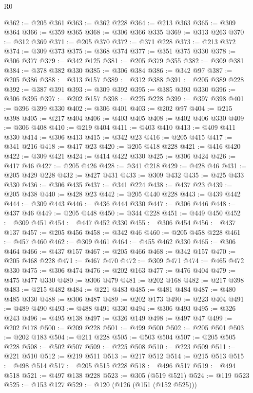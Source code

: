 \begin{lexlean}{R0}
\begin{coremodule}
@362 := @205 @361
@363 := @362 @228
@364 := @213 @363
@365 := @309 @364
@366 := @359 @365
@368 := @306 @366 @335
@369 := @313 @263
@370 := @312 @369
@371 := @205 @370
@372 := @371 @228
@373 := @213 @372
@374 := @309 @373
@375 := @368 @374
@377 := @351 @375 @330
@378 := @306 @377
@379 := @342 @125
@381 := @205 @379 @355
@382 := @309 @381
@384 := @378 @382 @330
@385 := @306 @384
@386 := @342 @97
@387 := @205 @386
@388 := @313 @157
@389 := @312 @388
@391 := @205 @389 @228
@392 := @387 @391
@393 := @309 @392
@395 := @385 @393 @330
@396 := @306 @395
@397 := @202 @157
@398 := @225 @228
@399 := @397 @398
@401 := @396 @399 @330
@402 := @306 @401
@403 := @202 @97
@404 := @215 @398
@405 := @217 @404
@406 := @403 @405
@408 := @402 @406 @330
@409 := @306 @408
@410 := @219 @404
@411 := @403 @410
@413 := @409 @411 @330
@414 := @306 @413
@415 := @342 @23
@416 := @205 @415
@417 := @341 @216
@418 := @417 @23
@420 := @205 @418 @228
@421 := @416 @420
@422 := @309 @421
@424 := @414 @422 @330
@425 := @306 @424
@426 := @417 @46
@427 := @205 @426
@428 := @341 @218
@429 := @428 @46
@431 := @205 @429 @228
@432 := @427 @431
@433 := @309 @432
@435 := @425 @433 @330
@436 := @306 @435
@437 := @341 @224
@438 := @437 @23
@439 := @205 @438
@440 := @428 @23
@442 := @205 @440 @228
@443 := @439 @442
@444 := @309 @443
@446 := @436 @444 @330
@447 := @306 @446
@448 := @437 @46
@449 := @205 @448
@450 := @344 @228
@451 := @449 @450
@452 := @309 @451
@454 := @447 @452 @330
@455 := @306 @454
@456 := @437 @137
@457 := @205 @456
@458 := @342 @46
@460 := @205 @458 @228
@461 := @457 @460
@462 := @309 @461
@464 := @455 @462 @330
@465 := @306 @464
@466 := @437 @157
@467 := @205 @466
@468 := @342 @157
@470 := @205 @468 @228
@471 := @467 @470
@472 := @309 @471
@474 := @465 @472 @330
@475 := @306 @474
@476 := @202 @163
@477 := @476 @404
@479 := @475 @477 @330
@480 := @306 @479
@481 := @202 @168
@482 := @217 @398
@483 := @215 @482
@484 := @221 @483
@485 := @481 @484
@487 := @480 @485 @330
@488 := @306 @487
@489 := @202 @173
@490 := @223 @404
@491 := @489 @490
@493 := @488 @491 @330
@494 := @306 @493
@495 := @326 @243
@496 := @495 @138
@497 := @326 @149
@498 := @497 @47
@499 := @202 @178
@500 := @209 @228
@501 := @499 @500
@502 := @205 @501
@503 := @202 @183
@504 := @211 @228
@505 := @503 @504
@507 := @205 @505 @228
@508 := @502 @507
@509 := @225 @508
@510 := @223 @509
@511 := @221 @510
@512 := @219 @511
@513 := @217 @512
@514 := @215 @513
@515 := @498 @514
@517 := @205 @515 @228
@518 := @496 @517
@519 := @494 @518
@521 := @497 @138 @228
@523 := @305 (@519 @521)
@524 := @119 @523
@525 := @153 @127
@529 := @120 (@126 (@151 (@152 @525)))

\end{coremodule}
\end{lexlean}
